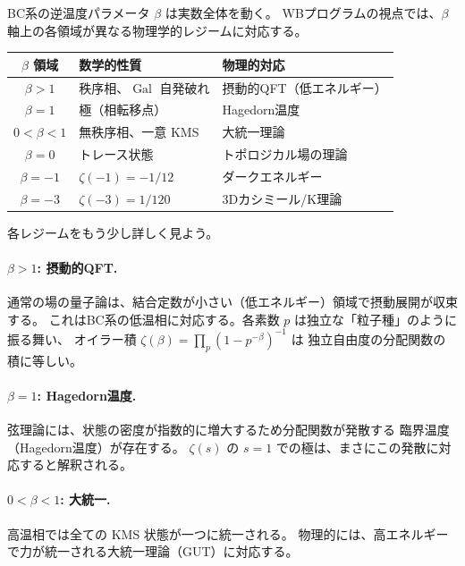 \documentclass[11pt,a4paper]{article}
\theoremstyle{definition}
\newcommand{\Gal}{\operatorname{Gal}}
\begin{document}
BC系の逆温度パラメータ $\beta$ は実数全体を動く。
WBプログラムの視点では、$\beta$ 軸上の各領域が異なる物理学的レジームに対応する。

\begin{keybox}
\begin{center}
\renewcommand{\arraystretch}{1.3}
\begin{tabular}{c|l|l}
  \hline
  $\beta$ 領域 & 数学的性質 & 物理的対応 \\
  \hline
  $\beta > 1$ & 秩序相、$\Gal$ 自発破れ & 摂動的QFT（低エネルギー） \\
  $\beta = 1$ & 極（相転移点） & Hagedorn温度 \\
  $0 < \beta < 1$ & 無秩序相、一意 KMS & 大統一理論 \\
  $\beta = 0$ & トレース状態 & トポロジカル場の理論 \\
  $\beta = -1$ & $\zeta(-1) = -1/12$ & ダークエネルギー \\
  $\beta = -3$ & $\zeta(-3) = 1/120$ & 3Dカシミール/K理論 \\
  \hline
\end{tabular}
\end{center}
\end{keybox}

各レジームをもう少し詳しく見よう。

\paragraph{$\beta > 1$: 摂動的QFT.}
通常の場の量子論は、結合定数が小さい（低エネルギー）領域で摂動展開が収束する。
これはBC系の低温相に対応する。各素数 $p$ は独立な「粒子種」のように振る舞い、
オイラー積 $\zeta(\beta) = \prod_p(1-p^{-\beta})^{-1}$ は
独立自由度の分配関数の積に等しい。

\paragraph{$\beta = 1$: Hagedorn温度.}
弦理論には、状態の密度が指数的に増大するため分配関数が発散する
臨界温度（Hagedorn温度）が存在する。
$\zeta(s)$ の $s=1$ での極は、まさにこの発散に対応すると解釈される。

\paragraph{$0 < \beta < 1$: 大統一.}
高温相では全ての KMS 状態が一つに統一される。
物理的には、高エネルギーで力が統一される大統一理論（GUT）に対応する。
\end{document}
